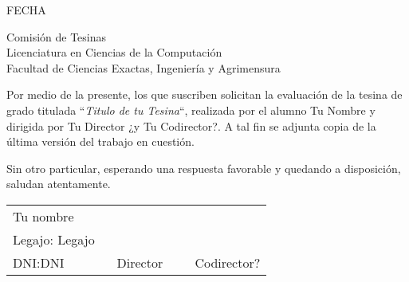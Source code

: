 \documentclass[14pt]{extbook}
\begin{document}
\thispagestyle{empty}
\begin{flushright}
	FECHA
\end{flushright}
Comisión de Tesinas
\\
Licenciatura en Ciencias de la Computación
\\
Facultad de Ciencias Exactas, Ingeniería y Agrimensura

\vspace{2em}
Por medio de la presente, los que suscriben solicitan la evaluación de la
tesina de grado titulada
``\textit{Titulo de tu Tesina}``,
realizada por el alumno Tu Nombre y dirigida por Tu Director ¿y
Tu Codirector?. A tal fin se adjunta copia de la última versión
del trabajo en cuestión.

Sin otro particular, esperando una respuesta favorable y quedando a
disposición, saludan atentamente.

\vspace{8cm}
\begin{tabular}{m{0.4\linewidth} m{0.3\linewidth} m{0.3\linewidth}}
	Tu nombre\\
	Legajo: Legajo\\
	DNI:DNI
	&
	Director
	&
	Codirector?
\end{tabular}
\end{document}
